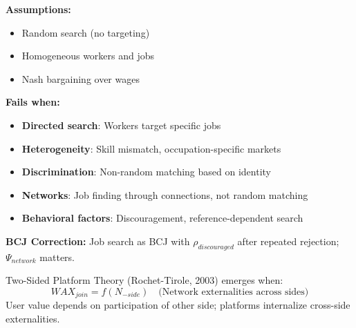 \begin{tcolorbox}[colback=red!5!white, colframe=red!75!black, title=Boundary Condition: Where DMP Search Fails]
\textbf{Assumptions:}
\begin{itemize}[nosep]
\item Random search (no targeting)
\item Homogeneous workers and jobs
\item Nash bargaining over wages
\end{itemize}

\textbf{Fails when:}
\begin{itemize}[nosep]
\item \textbf{Directed search}: Workers target specific jobs
\item \textbf{Heterogeneity}: Skill mismatch, occupation-specific markets
\item \textbf{Discrimination}: Non-random matching based on identity
\item \textbf{Networks}: Job finding through connections, not random matching
\item \textbf{Behavioral factors}: Discouragement, reference-dependent search
\end{itemize}

\textbf{BCJ Correction:} Job search as BCJ with $\rho_{discouraged}$ after repeated rejection; $\Psi_{network}$ matters.
\end{tcolorbox}


\begin{theorem}
\label{thm:two-sided-platforms}
Two-Sided Platform Theory (Rochet-Tirole, 2003) emerges when:
\begin{equation}
\boxed{WAX_{join} = f(N_{-side}) \quad \text{(Network externalities across sides)}}
\end{equation}
User value depends on participation of other side; platforms internalize cross-side externalities.
\end{theorem}

